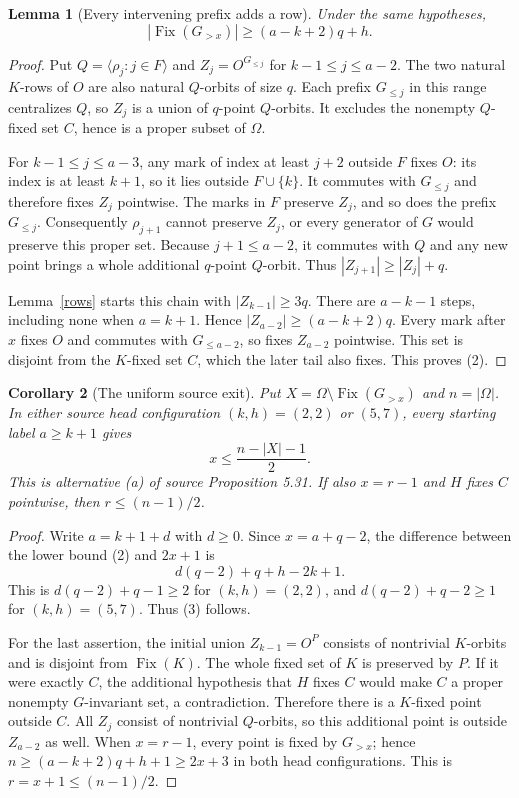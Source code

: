 \documentclass[11pt,a4paper]{article}
\newtheorem{lemma}{Lemma}
\newtheorem{corollary}[lemma]{Corollary}
\newcommand{\gen}[1]{\langle#1\rangle}
\begin{document}
\begin{lemma}[Every intervening prefix adds a row]\label{growth}
Under the same hypotheses,
\[
             |\operatorname{Fix}(G_{>x})|
                    \ge(a-k+2)q+h.                    \tag{2}
\]
\end{lemma}
\begin{proof}
Put $Q=\gen{\rho_j:j\in F}$ and
$Z_j=O^{G_{\le j}}$ for $k-1\le j\le a-2$.
The two natural $K$-rows of $O$ are also natural $Q$-orbits of
size $q$. Each prefix $G_{\le j}$ in this range centralizes $Q$,
so $Z_j$ is a union of $q$-point $Q$-orbits. It excludes the
nonempty $Q$-fixed set $C$, hence is a proper subset of $\Omega$.

For $k-1\le j\le a-3$, any mark of index at least $j+2$ outside
$F$ fixes $O$: its index is at least $k+1$, so it lies outside
$F\cup\{k\}$. It commutes with $G_{\le j}$ and therefore fixes
$Z_j$ pointwise. The marks in $F$ preserve $Z_j$, and so does
the prefix $G_{\le j}$. Consequently $\rho_{j+1}$ cannot preserve
$Z_j$, or every generator of $G$ would preserve this proper set.
Because $j+1\le a-2$, it commutes with $Q$ and any new point
brings a whole additional $q$-point $Q$-orbit. Thus
$|Z_{j+1}|\ge|Z_j|+q$.

Lemma~\ref{rows} starts this chain with $|Z_{k-1}|\ge3q$.
There are $a-k-1$ steps, including none when $a=k+1$.
Hence $|Z_{a-2}|\ge(a-k+2)q$. Every mark after $x$ fixes $O$
and commutes with $G_{\le a-2}$, so fixes $Z_{a-2}$ pointwise.
This set is disjoint from the $K$-fixed set $C$, which the later
tail also fixes. This proves (2).
\end{proof}

\begin{corollary}[The uniform source exit]\label{exit}
Put $X=\Omega\setminus\operatorname{Fix}(G_{>x})$ and
$n=|\Omega|$. In either source head configuration
$(k,h)=(2,2)$ or $(5,7)$, every starting label $a\ge k+1$ gives
\[
                         x\le\frac{n-|X|-1}{2}.        \tag{3}
\]
This is alternative (a) of source Proposition 5.31.
If also $x=r-1$ and $H$ fixes $C$ pointwise, then
$r\le(n-1)/2$.
\end{corollary}
\begin{proof}
Write $a=k+1+d$ with $d\ge0$. Since $x=a+q-2$, the difference
between the lower bound (2) and $2x+1$ is
\[
                       d(q-2)+q+h-2k+1.
\]
This is $d(q-2)+q-1\ge2$ for $(k,h)=(2,2)$, and
$d(q-2)+q-2\ge1$ for $(k,h)=(5,7)$. Thus (3) follows.

For the last assertion, the initial union $Z_{k-1}=O^P$ consists
of nontrivial $K$-orbits and is disjoint from $\operatorname{Fix}(K)$.
The whole fixed set of $K$ is preserved by $P$. If it were exactly
$C$, the additional hypothesis that $H$ fixes $C$ would make $C$
a proper nonempty $G$-invariant set, a contradiction. Therefore
there is a $K$-fixed point outside $C$.
All $Z_j$ consist of nontrivial $Q$-orbits, so this additional
point is outside $Z_{a-2}$ as well. When $x=r-1$, every point is
fixed by $G_{>x}$; hence
$n\ge(a-k+2)q+h+1\ge2x+3$ in both head configurations.
This is $r=x+1\le(n-1)/2$.
\end{proof}
\end{document}
